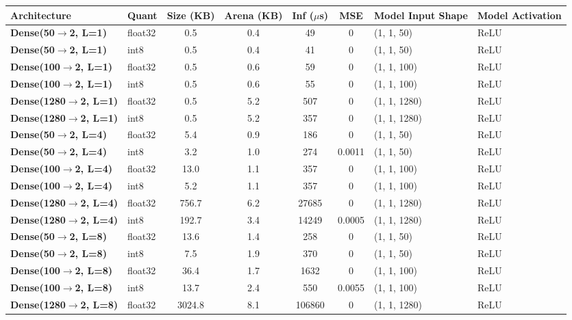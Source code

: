 \begin{tabular}{llccccll}
\toprule
\textbf{Architecture} & Quant & Size (KB) & Arena (KB) & Inf ($\mu$s) & MSE & Model Input Shape & Model Activation \\
\midrule
\textbf{Dense(50$\to$2, L=1)} & float32 & 0.5 & 0.4 & 49 & 0 & (1, 1, 50) & ReLU \\
\textbf{Dense(50$\to$2, L=1)} & int8 & 0.5 & 0.4 & 41 & 0 & (1, 1, 50) & ReLU \\
\textbf{Dense(100$\to$2, L=1)} & float32 & 0.5 & 0.6 & 59 & 0 & (1, 1, 100) & ReLU \\
\textbf{Dense(100$\to$2, L=1)} & int8 & 0.5 & 0.6 & 55 & 0 & (1, 1, 100) & ReLU \\
\textbf{Dense(1280$\to$2, L=1)} & float32 & 0.5 & 5.2 & 507 & 0 & (1, 1, 1280) & ReLU \\
\textbf{Dense(1280$\to$2, L=1)} & int8 & 0.5 & 5.2 & 357 & 0 & (1, 1, 1280) & ReLU \\
\textbf{Dense(50$\to$2, L=4)} & float32 & 5.4 & 0.9 & 186 & 0 & (1, 1, 50) & ReLU \\
\textbf{Dense(50$\to$2, L=4)} & int8 & 3.2 & 1.0 & 274 & 0.0011 & (1, 1, 50) & ReLU \\
\textbf{Dense(100$\to$2, L=4)} & float32 & 13.0 & 1.1 & 357 & 0 & (1, 1, 100) & ReLU \\
\textbf{Dense(100$\to$2, L=4)} & int8 & 5.2 & 1.1 & 357 & 0 & (1, 1, 100) & ReLU \\
\textbf{Dense(1280$\to$2, L=4)} & float32 & 756.7 & 6.2 & 27685 & 0 & (1, 1, 1280) & ReLU \\
\textbf{Dense(1280$\to$2, L=4)} & int8 & 192.7 & 3.4 & 14249 & 0.0005 & (1, 1, 1280) & ReLU \\
\textbf{Dense(50$\to$2, L=8)} & float32 & 13.6 & 1.4 & 258 & 0 & (1, 1, 50) & ReLU \\
\textbf{Dense(50$\to$2, L=8)} & int8 & 7.5 & 1.9 & 370 & 0 & (1, 1, 50) & ReLU \\
\textbf{Dense(100$\to$2, L=8)} & float32 & 36.4 & 1.7 & 1632 & 0 & (1, 1, 100) & ReLU \\
\textbf{Dense(100$\to$2, L=8)} & int8 & 13.7 & 2.4 & 550 & 0.0055 & (1, 1, 100) & ReLU \\
\textbf{Dense(1280$\to$2, L=8)} & float32 & 3024.8 & 8.1 & 106860 & 0 & (1, 1, 1280) & ReLU \\
\bottomrule
\end{tabular}
